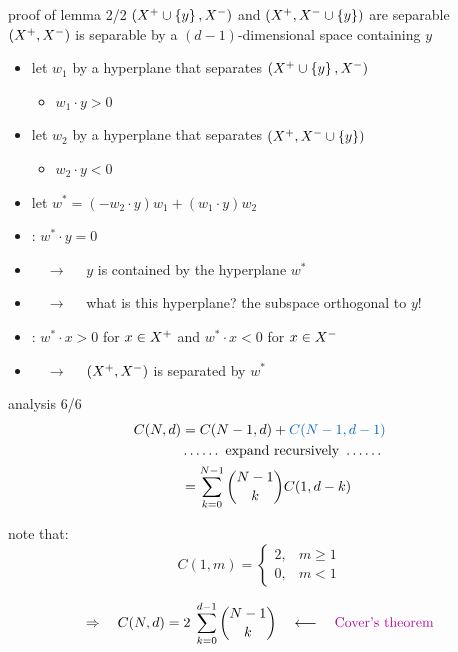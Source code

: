 \documentclass[aspectratio=169, 11pt, handout]{beamer}
\begin{document}
\begin{frame}{proof of lemma 2/2}
      $\left(X^{+} \cup \left\{y\right\}, X^{-}\right)$ and $\left(X^{+}, X^{-}  \cup \left\{y\right\}\right)$ are separable   \txtblue{$\Rightarrow$} $\left(X^{+}, X^{-}\right)$ is separable by a $(d-1)$-dimensional space containing $y$
\pause
\begin{itemize}[<+->]
	\item {let $w_1$ by a hyperplane that separates $\left(X^{+} \cup \left\{y\right\}, X^{-}\right)$
	\begin{itemize}
		\item $w_1 \cdot y > 0$
	\end{itemize}
	}
	\item {let $w_2$ by a hyperplane that separates $\left(X^{+}, X^{-} \cup \left\{y\right\}\right)$
		\begin{itemize}
		\item $w_2 \cdot y < 0$
	\end{itemize}
	}
	\item let $w^* = (-w_2 \cdot y) w_1 + (w_1 \cdot y) w_2$
	\item {}: $w^* \cdot y = 0$ 
	\item[]  $\quad\rightarrow\quad$ $y$ is contained by the hyperplane $w^*$
        \item[] $\quad\rightarrow\quad$ what is this hyperplane? \pause the subspace orthogonal to $y$!
	\item {}: $w^*\cdot x  > 0$ for $x \in X^{+}$ and  $w^* \cdot x  < 0$ for $x \in X^{-}$ 
	\item[] $\quad \rightarrow \quad$ $\left(X^{+}, X^{-}\right)$ is separated by $w^*$
\end{itemize}
\end{frame}

\begin{frame}{analysis 6/6}
  \begin{align*}
    C(N, d) &= C(N-1, d) + \txtblue{C(N-1, d-1)} \\
            & \ldots\ldots \text{ expand recursively } \ldots\ldots \\
            &=  \sum\limits_{k=0}^{N-1} {N -1\choose k} C(1, d-k)
  \end{align*}

  \pause
  note that:
  $$
    C(1, m) = 
    \begin{cases}
      2, &m \ge 1 \\
      0, &m < 1
    \end{cases}
    $$

    \pause
\[
  \Rightarrow \quad C(N, d) = 2\;\sum\limits_{k=0}^{d-1} {N -1\choose k} \quad \longleftarrow \quad \text{\head{Cover's theorem}}
\]

\end{frame}
\end{document}
